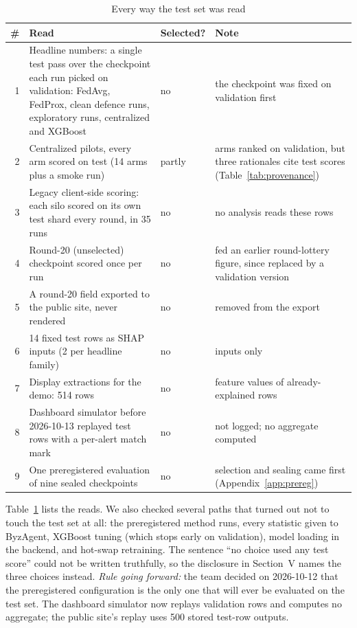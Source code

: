 \begin{table}[t]
\centering
\caption{Every way the test set was read}
\label{tab:exposure}
\footnotesize
\begin{tabularx}{\textwidth}{@{}rXlX@{}}
\toprule
\# & Read & Selected? & Note\\
\midrule
1 & Headline numbers: a single test pass over the checkpoint each run picked on validation: FedAvg, FedProx, clean defence runs, exploratory runs, centralized and XGBoost & no & the checkpoint was fixed on validation first\\ %
2 & Centralized pilots, every arm scored on test (14 arms plus a smoke run) & partly & arms ranked on validation, but three rationales cite test scores (Table~\ref{tab:provenance})\\ %
3 & Legacy client-side scoring: each silo scored on its own test shard every round, in 35 runs & no & no analysis reads these rows\\ %
4 & Round-20 (unselected) checkpoint scored once per run & no & fed an earlier round-lottery figure, since replaced by a validation version\\ %
5 & A round-20 field exported to the public site, never rendered & no & removed from the export\\ %
6 & 14 fixed test rows as SHAP inputs (2 per headline family) & no & inputs only\\ %
7 & Display extractions for the demo: 514 rows & no & feature values of already-explained rows\\ %
8 & Dashboard simulator before 2026-10-13 replayed test rows with a per-alert match mark & no & not logged; no aggregate computed\\ %
9 & One preregistered evaluation of nine sealed checkpoints & no & selection and sealing came first (Appendix~\ref{app:prereg})\\ %
\bottomrule
\end{tabularx}
\end{table}

Table~\ref{tab:exposure} lists the reads. We also checked several paths that turned out
not to touch the test set at all: the preregistered method runs, every statistic given to
ByzAgent, XGBoost tuning (which stops early on validation), model loading in the backend,
and hot-swap retraining. The sentence ``no
choice used any test score'' could not be written truthfully, so the disclosure in
Section~V names the three choices instead. \emph{Rule going forward:} the team decided
on 2026-10-12 that the preregistered configuration is the only one that will ever be %
evaluated on the test set. The dashboard simulator now replays validation rows and computes no aggregate;
the public site's replay uses 500 stored test-row outputs. %

